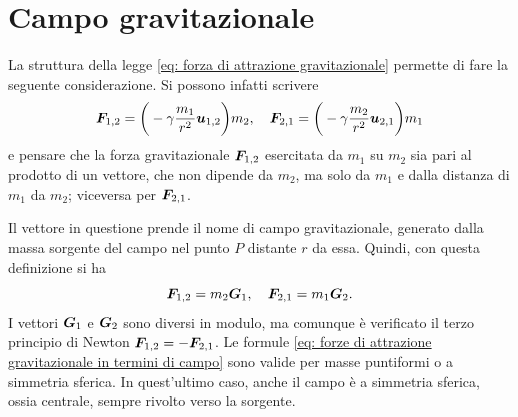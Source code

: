 \section{Campo gravitazionale}
La struttura della legge \eqref{eq: forza di attrazione gravitazionale} permette di fare la seguente considerazione. Si possono infatti scrivere
\begin{equation}
    \bm{F}_{1,2}=\bigg(-\gamma\frac{m_1}{r^2}\bm{u}_{1,2}\bigg)m_2,\quad\bm{F}_{2,1}=\bigg(-\gamma\frac{m_2}{r^2}\bm{u}_{2,1}\bigg)m_1
\end{equation}
e pensare che la forza gravitazionale $\bm{F}_{1,2}$ esercitata da $m_1$ su $m_2$ sia pari al prodotto di un vettore, che non dipende da $m_2$, ma solo da $m_1$ e dalla distanza di $m_1$ da $m_2$; viceversa per $\bm{F}_{2,1}$. 

Il vettore in questione prende il nome di campo gravitazionale, generato dalla massa sorgente del campo nel punto $P$ distante $r$ da essa. Quindi, con questa definizione si ha
\begin{equation}
\label{eq: forze di attrazione gravitazionale in termini di campo}
    \bm{F}_{1,2}=m_2\bm{G}_1,\quad\bm{F}_{2,1}=m_1\bm{G}_2.
\end{equation}
I vettori $\bm{G}_1$ e $\bm{G}_2$ sono diversi in modulo, ma comunque è verificato il terzo principio di Newton $\bm{F}_{1,2}=-\bm{F}_{2,1}$. Le formule \eqref{eq: forze di attrazione gravitazionale in termini di campo} sono valide per masse puntiformi o a simmetria sferica. In quest'ultimo caso, anche il campo è a simmetria sferica, ossia centrale, sempre rivolto verso la sorgente.

